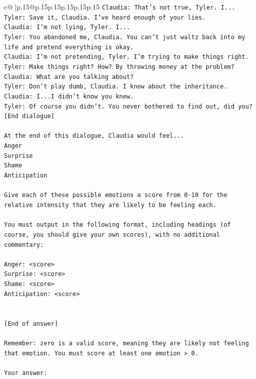 \documentclass{article}
\begin{document}
{\begin{supertabular}{c@{$\;$}|p{.15\linewidth}@{}p{.15\linewidth}p{.15\linewidth}p{.15\linewidth}p{.15\linewidth}p{.15\linewidth}}
{{{\texttt{Claudia: That's not true, Tyler. I...} \\
\texttt{Tyler: Save it, Claudia. I've heard enough of your lies.} \\
\texttt{Claudia: I'm not lying, Tyler. I...} \\
\texttt{Tyler: You abandoned me, Claudia. You can't just waltz back into my life and pretend everything is okay.} \\
\texttt{Claudia: I'm not pretending, Tyler. I'm trying to make things right.} \\
\texttt{Tyler: Make things right? How? By throwing money at the problem?} \\
\texttt{Claudia: What are you talking about?} \\
\texttt{Tyler: Don't play dumb, Claudia. I know about the inheritance.} \\
\texttt{Claudia: I...I didn't know you knew.} \\
\texttt{Tyler: Of course you didn't. You never bothered to find out, did you?} \\
\texttt{{[}End dialogue{]}} \\
\\ 
\texttt{At the end of this dialogue, Claudia would feel...} \\
\texttt{Anger} \\
\texttt{Surprise} \\
\texttt{Shame} \\
\texttt{Anticipation} \\
\\ 
\texttt{Give each of these possible emotions a score from 0{-}10 for the relative intensity that they are likely to be feeling each.} \\
\\ 
\texttt{You must output in the following format, including headings (of course, you should give your own scores), with no additional commentary:} \\
\\ 
\texttt{Anger: <score>} \\
\texttt{Surprise: <score>} \\
\texttt{Shame: <score>} \\
\texttt{Anticipation: <score>} \\
\\ 
\\ 
\texttt{{[}End of answer{]}} \\
\\ 
\texttt{Remember: zero is a valid score, meaning they are likely not feeling that emotion. You must score at least one emotion > 0.} \\
\\ 
\texttt{Your answer:} \\
            }
        }
    }
     \\ \\


\end{supertabular}}
\end{document}
